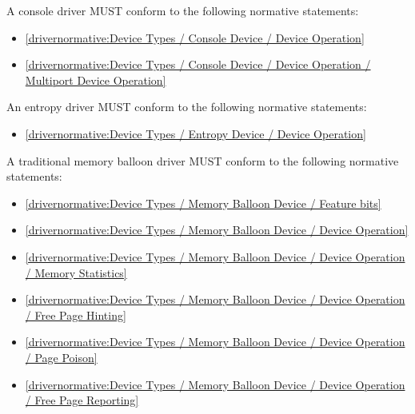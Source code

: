 A console driver MUST conform to the following normative statements:

\begin{itemize}
\item \ref{drivernormative:Device Types / Console Device / Device Operation}
\item \ref{drivernormative:Device Types / Console Device / Device Operation / Multiport Device Operation}
\end{itemize}

\label{sec:Conformance / Driver Conformance / Entropy Driver Conformance}

An entropy driver MUST conform to the following normative statements:

\begin{itemize}
\item \ref{drivernormative:Device Types / Entropy Device / Device Operation}
\end{itemize}

\label{sec:Conformance / Driver Conformance / Traditional Memory Balloon Driver Conformance}

A traditional memory balloon driver MUST conform to the following normative statements:

\begin{itemize}
\item \ref{drivernormative:Device Types / Memory Balloon Device / Feature bits}
\item \ref{drivernormative:Device Types / Memory Balloon Device / Device Operation}
\item \ref{drivernormative:Device Types / Memory Balloon Device / Device Operation / Memory Statistics}
\item \ref{drivernormative:Device Types / Memory Balloon Device / Device Operation / Free Page Hinting}
\item \ref{drivernormative:Device Types / Memory Balloon Device / Device Operation / Page Poison}
\item \ref{drivernormative:Device Types / Memory Balloon Device / Device Operation / Free Page Reporting}
\end{itemize}

